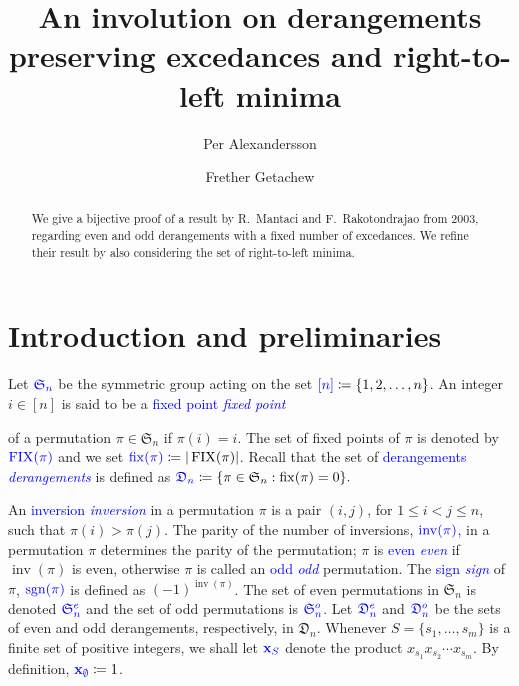 \documentclass[reqno]{amsart}
\title[An involution on derangements preserving EXC and RL-minima]{An involution on derangements preserving excedances and right-to-left minima}
\author[Per Alexandersson]{Per Alexandersson}
\author[Frether Getachew]{Frether Getachew}
\theoremstyle{definition}
\newcommand{\defin}[1]{%
\relax\ifmmode%
\textcolor{blue}{#1}%
\else\textcolor{blue}{\emph{#1}}%
\fi%
}
\newcommand{\xvec}{\mathbf{x}}
\newcommand{\symS}{\mathfrak{S}}
\newcommand{\dArr}{\mathfrak{D}}
\DeclareMathOperator{\inv}{inv}
\DeclareMathOperator{\sgn}{sgn}
\DeclareMathOperator{\fix}{fix}
\DeclareMathOperator{\FIX}{FIX}
\begin{document}

\begin{abstract}
 We give a bijective proof of a result by R.~Mantaci and F.~Rakotondrajao from 2003,
 regarding even and odd derangements with a fixed number of excedances.
 We refine their result by also considering the set of right-to-left minima.
\end{abstract}

\maketitle 

\section{Introduction and preliminaries}

%
Let $\defin{\symS_n}$
be the symmetric group acting on the set
$\defin{[n]} \coloneqq \{1,2,\dotsc,n\}$. An integer $i\in[n]$ is said to be a \defin{fixed point} 
of a permutation $\pi\in\symS_n$ if $\pi(i)=i$. The set of fixed points of $\pi$ is denoted by $\defin{\FIX(\pi)}$
and we set $\defin{\fix(\pi)} \coloneqq |\FIX(\pi)|$.
Recall that the set of \defin{derangements} is defined as
$
\defin{\dArr_n} \coloneqq \{ \pi \in \symS_n : \fix(\pi) = 0 \}.
$

An \defin{inversion} in a permutation 
$\pi$ is a pair $(i,j)$, for 
$1\leq i < j \leq n$, such that 
$\pi(i)>\pi(j)$. The parity of the number of
inversions, $\defin{\inv(\pi)}$, in a permutation $\pi$ determines the 
parity of the permutation; $\pi$ is \defin{even} if $\inv(\pi)$ is even, otherwise $\pi$ is called an \defin{odd} permutation. 
The \defin{sign} of $\pi$, $\defin{\sgn(\pi)}$ is defined as $(-1)^{\inv(\pi)}$.
The set of even 
permutations in $\symS_n$ is denoted
$\defin{\symS^e_n}$ and the set of odd 
permutations is $\defin{\symS^o_n}$. Let 
$\defin{\dArr^e_n}$ and $\defin{\dArr^o_n}$ be 
the sets of even and odd 
derangements, respectively, in $\dArr_n$. 
Whenever $S = \{s_1,\dotsc,s_m\}$ is a finite set 
of positive integers,
we shall let $\defin{\xvec_S}$ denote the product $x_{s_1}x_{s_2}\dotsm x_{s_m}$.
By definition, $\defin{\xvec_\emptyset} \coloneqq 1$.
\end{document}
